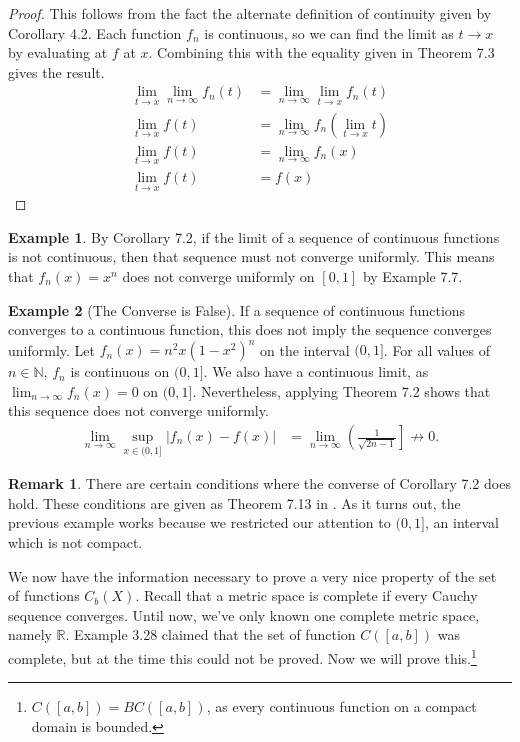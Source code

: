 \documentclass{article}
\newcommand{\N}{\mathbb{N}}
\newcommand{\R}{\mathbb{R}}
\theoremstyle{definition}
\newtheorem{example}{Example}[section]
\newtheorem{remark}{Remark}[section]
\begin{document}
	\begin{proof}
		This follows from the fact the alternate definition of continuity given by Corollary 4.2. Each function $ f_n $ is continuous, so we can find the limit as $ t\to x $ by evaluating at $ f $ at $ x $. Combining this with the equality given in Theorem 7.3 gives the result. 
		\begin{align*}
			\lim\limits_{t\to x}\lim\limits_{n\to\infty}f_n(t)&=\lim\limits_{n\to\infty} \lim\limits_{t\to x}f_n(t)\\ 	\lim\limits_{t\to x}f(t)&=\lim\limits_{n\to\infty}f_n\left( \lim\limits_{t\to x} t\right)\\
			\lim\limits_{t\to x}f(t)&=\lim\limits_{n\to\infty}f_n\left(x\right)\\
			\lim\limits_{t\to x}f(t)&=f\left(x\right)
		\end{align*}
	\end{proof}
	\begin{example}
		By Corollary 7.2, if the limit of a sequence of continuous functions is not continuous, then that sequence must not converge uniformly. This means that $ f_n(x)=x^n $ does not converge uniformly on $ [0,1] $ by Example 7.7.
	\end{example}
	\begin{example}[The Converse is False]
		If a sequence of continuous functions converges to a continuous function, this does not imply the sequence converges uniformly. Let $ f_n(x)=n^2x(1-x^2)^n $ on the interval $ (0,1] $. For all values of $ n\in\N $, $ f_n $ is continuous on $ (0,1] $. We also have a continuous limit, as $ \lim_{n\to\infty}f_n(x)=0 $ on $ (0,1] $. Nevertheless, applying Theorem 7.2 shows that this sequence does not converge uniformly. 
		\begin{align*}
			\lim\limits_{n\to\infty}\sup_{x\in (0,1]}|f_n(x)-f(x)|&=\lim\limits_{n\to\infty}\left(\frac{1}{\sqrt{2n-1}}\right]\not\to 0.
		\end{align*}
		\begin{remark}
			There are certain conditions where the converse of Corollary 7.2 does hold. These conditions are given as Theorem 7.13 in \cite{rudin1964principles}. As it turns out, the previous example works because we restricted our attention to $ (0,1] $, an interval which is not compact. 
		\end{remark}
		
		We now have the information necessary to prove a very nice property of the set of functions $ C_b(X) $. Recall that a metric space is complete if every Cauchy sequence converges. Until now, we've only known one complete metric space, namely $ \R $. Example 3.28 claimed that the set of function $ C([a,b]) $ was complete, but at the time this could not be proved. Now we will prove this.\footnote{$ C([a,b])=BC([a,b]) $, as every continuous function on a compact domain is bounded.}
	\end{example}
\end{document}
